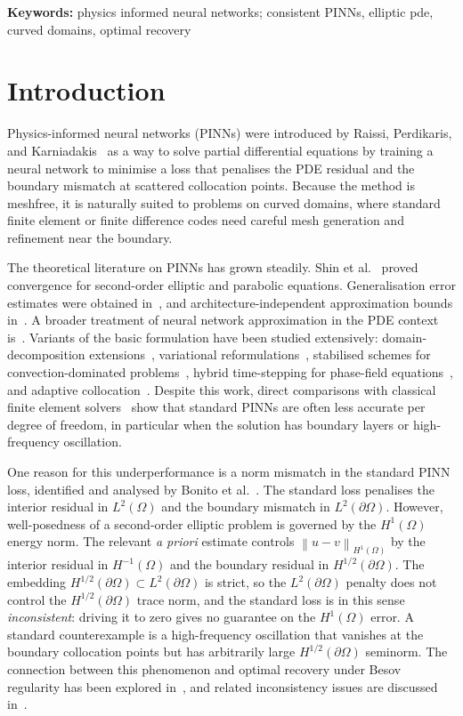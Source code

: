 \documentclass[11pt]{article}
\newcommand{\Omg}{\Omega}
\newcommand{\bOmg}{\partial\Omega}
\newcommand{\norm}[1]{\left\|#1\right\|}
\begin{document}
\textbf{Keywords:}  physics informed neural networks; consistent PINNs, elliptic pde, curved domains, optimal
recovery 


\section{Introduction}
\label{sec:intro}

Physics-informed neural networks (PINNs) were introduced by Raissi,
Perdikaris, and Karniadakis~\cite{raissi2019} as a way to solve
partial differential equations by training a neural network to
minimise a loss that penalises the PDE residual and the boundary
mismatch at scattered collocation points. Because the method is
meshfree, it is naturally suited to problems on curved domains,
where standard finite element or finite difference codes need
careful mesh generation and refinement near the boundary.

The theoretical literature on PINNs has grown steadily. Shin et
al.~\cite{shin2020convergence} proved convergence for second-order
elliptic and parabolic equations. Generalisation error estimates
were obtained in~\cite{mishra2023estimates, de2024numerical}, and
architecture-independent approximation bounds
in~\cite{de2022generic}. A broader treatment of neural network
approximation in the PDE context is~\cite{devore2021neural}.
Variants of the basic formulation have been studied extensively:
domain-decomposition extensions~\cite{hu2022extended}, variational
reformulations~\cite{anandh2025fastvpinns, anandh2025improving},
stabilised schemes for convection-dominated
problems~\cite{cengizci2026pinn, raina2026application}, hybrid
time-stepping for phase-field
equations~\cite{singh2024ss, singh2026mc}, and adaptive
collocation~\cite{visser2026pacmann}. Despite this work, direct
comparisons with classical finite element
solvers~\cite{grossmann2023pinn} show that standard PINNs are often
less accurate per degree of freedom, in particular when the
solution has boundary layers or high-frequency oscillation.

One reason for this underperformance is a norm mismatch in the
standard PINN loss, identified and analysed by Bonito et
al.~\cite{bonito2025}. The standard loss penalises the interior
residual in $L^2(\Omg)$ and the boundary mismatch in $L^2(\bOmg)$.
However, well-posedness of a second-order elliptic problem is
governed by the $H^1(\Omg)$ energy norm. The relevant \emph{a priori}
estimate controls $\norm{u-v}_{H^1(\Omg)}$ by the interior residual
in $H^{-1}(\Omg)$ and the boundary residual in $H^{1/2}(\bOmg)$. The
embedding $H^{1/2}(\bOmg)\subset L^2(\bOmg)$ is strict, so the
$L^2(\bOmg)$ penalty does not control the $H^{1/2}(\bOmg)$ trace
norm, and the standard loss is in this sense \emph{inconsistent}:
driving it to zero gives no guarantee on the $H^1(\Omg)$ error. A
standard counterexample is a high-frequency oscillation that
vanishes at the boundary collocation points but has arbitrarily
large $H^{1/2}(\bOmg)$ seminorm. The connection between this
phenomenon and optimal recovery under Besov regularity has been
explored in~\cite{devore1993besov, cohen2022optimal}, and related
inconsistency issues are discussed
in~\cite{zeinhofer2025unified, frerichs2026loss}.
\end{document}
